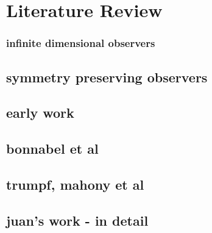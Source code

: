 \section{Literature Review}

\subsubsection{infinite dimensional observers}
\subsection{symmetry preserving observers}
\subsection{early work}
\subsection{bonnabel et al}
\subsection{trumpf, mahony et al}
\subsection{juan's work - in detail}
